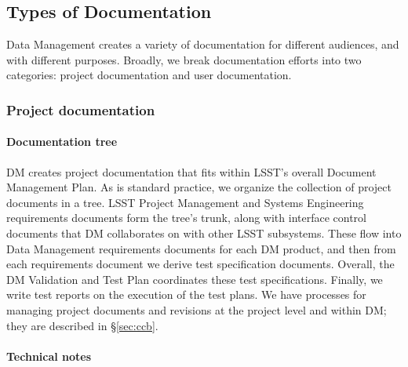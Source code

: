 \subsection{Types of Documentation}
\label{sec:doc_types}

Data Management creates a variety of documentation for different audiences, and with different purposes.
Broadly, we break documentation efforts into two categories: project documentation and user documentation.

\subsubsection{Project documentation}
\label{sec:project_docs}

\paragraph{Documentation tree}

DM creates project documentation that fits within LSST's overall Document Management Plan.\cite{LPM-51}
As is standard practice, we organize the collection of project documents in a tree\cite{LDM-294}.
LSST Project Management and Systems Engineering requirements documents form the tree's trunk, along with interface control documents that DM collaborates on with other LSST subsystems.
These flow into Data Management requirements documents for each DM product, and then from each requirements document we derive test specification documents.
Overall, the DM Validation and Test Plan\cite{LDM-503} coordinates these test specifications.
Finally, we write test reports on the execution of the test plans.
We have processes for managing project documents and revisions at the project level and within DM; they are described in \S\ref{sec:ccb}.

\paragraph{Technical notes}


